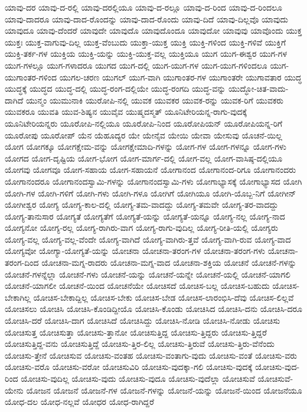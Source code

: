 {ಯಾವು-ದರ
ಯಾವು-ದ-ರಲ್ಲಿ
ಯಾವು-ದರಲ್ಲಿಯೂ
ಯಾವು-ದ-ರಲ್ಲೂ
ಯಾವು-ದ-ರಿಂದ
ಯಾವು-ದ-ರಿಂದಲೂ
ಯಾವು-ದಾದರೂ
ಯಾವು-ದಾದ-ರೊಂದನ್ನು
ಯಾವು-ದಾದ-ರೊಂದು
ಯಾವು-ದಿದೆ
ಯಾವು-ದಿಲ್ಲವೊ
ಯಾವುದು
ಯಾವುದೂ
ಯಾವು-ದೆಂದರೆ
ಯಾವುದೇ
ಯಾವುದೊ
ಯಾವುದೊಂದೂ
ಯಾವುದೋ
ಯಾವುವು
ಯಾವೊಂದು
ಯುಕ್ತ
ಯುಕ್ತಃ
ಯುಕ್ತ-ವಾಗುವು-ದಿಲ್ಲ
ಯುಕ್ತ-ವೆಂಬುದು
ಯುಕ್ತಾ-ಯುಕ್ತ
ಯುಕ್ತಿ
ಯುಕ್ತಿ-ಗಳಿಂದ
ಯುಕ್ತಿ-ಗಳಿವೆ
ಯುಕ್ತಿಗೆ
ಯುಕ್ತಿ-ತರ್ಕ-ಗಳ
ಯುಕ್ತಿಯ
ಯುಕ್ತಿ-ಯನ್ನು
ಯುಕ್ತಿ-ಯುಕ್ತ-ವಲ್ಲ
ಯುಕ್ತಿಯೂ
ಯುಗ
ಯುಗ-ಈಶ್ವರ
ಯುಗ-ಗಳ
ಯುಗ-ಗಳಲ್ಲೂ
ಯುಗ-ಗಳಾದರೂ
ಯುಗದ
ಯುಗ-ದಲ್ಲಿ
ಯುಗ-ಯುಗ-ಗಳ
ಯುಗ-ಯುಗ-ಗಳಿಂದಲೂ
ಯುಗ-ಯುಗಾಂತರ-ಗಳಿಂದ
ಯುಗಲ-ಚರಣ
ಯುಗಲ್
ಯುಗ-ವಾಗಿ
ಯುಗಾಂತರ-ಗಳ
ಯುಗಾಂತರೇ
ಯುಗಾವತಾರ
ಯುದ್ಧ
ಯುದ್ಧಕ್ಕೆ
ಯುದ್ಧದ
ಯುದ್ಧ-ದಲ್ಲಿ
ಯುದ್ಧ-ರಂಗ-ದಲ್ಲಿಯೇ
ಯುದ್ಧ-ರಂಗದಿ
ಯುದ್ಧ-ವನ್ನು
ಯುದ್ಧೋ-ಚಿತ-ವಾದು-ದಾಗಿದೆ
ಯುನ್ಮಂ
ಯುಮುನಾಕಿ
ಯುರೋಪಿ-ನಲ್ಲಿ
ಯುವಕ
ಯುವಕರ
ಯುವಕ-ರನ್ನು
ಯುವಕ-ರಿಗೆ
ಯುವಕರು
ಯುವಕರೂ
ಯುವತಿ
ಯುವ-ಶಿಷ್ಯನ
ಯುವೈವ
ಯುಷ್ಮದಸ್ಮತ್
ಯೂನಿಟೇರಿಯನ್ನ-ರಾಗು-ವುದಕ್ಕೆ
ಯೂನಿಟೇರಿಯನ್ನರು
ಯೂರೋಪಿ-ನಲ್ಲಿಯೂ
ಯೂರೋಪಿ-ನಿಂದ
ಯೂರೋಪಿಯನ್
ಯೂರೋಪಿಯನ್ನ-ರಿಗೆ
ಯೂರೋಪು
ಯೂರೋಪ್
ಯೆನ
ಯೆಹೂದ್ಯರ
ಯೇ
ಯೇನೈವ
ಯೇಯಿ
ಯೇವಾ
ಯೇಸುವು
ಯೊಚನೆ-ಯಿಲ್ಲ
ಯೋಗ
ಯೋಗಕ್ಕೂ
ಯೋಗಕ್ಷೇಮ-ವನ್ನು
ಯೋಗಕ್ಷೇಮಾದಿ-ಗಳನ್ನು
ಯೋಗ-ಗಳ
ಯೋಗ-ಗಳನ್ನೂ
ಯೋಗ-ಗಳು
ಯೋಗದ
ಯೋಗ-ದೃಷ್ಟಿಯ
ಯೋಗ-ಭೋಗ
ಯೋಗ-ಮಾರ್ಗ-ದಲ್ಲಿ
ಯೋಗ-ವಲ್ಲ
ಯೋಗ-ವಾಸಿಷ್ಠ-ದಲ್ಲಿಯೂ
ಯೋಗವು
ಯೋಗವೂ
ಯೋಗ-ಸಹಾಯ
ಯೋಗ-ಸಹಾಯನೆ
ಯೋಗಾನಂದ
ಯೋಗಾನಂದ-ರಿಗೂ
ಯೋಗಾನಂದರು
ಯೋಗಾನಂದರೂ
ಯೋಗಾನಂದಸ್ವಾಮಿ-ಗಳನ್ನು
ಯೋಗಾನಂದಸ್ವಾಮಿ-ಗಳು
ಯೋಗಾಭ್ಯಾಸಕ್ಕೆ
ಯೋಗಾಭ್ಯಾಸದ
ಯೋಗಿ
ಯೋಗಿ-ಗಳ
ಯೋಗಿ-ಗಳಿಗೆ
ಯೋಗಿ-ಗಳು
ಯೋಗಿ-ಗಳೂ
ಯೋಗಿಗೆ
ಯೋಗಿಯೂ
ಯೋಗಿ-ಯೊಬ್ಬ-ನಿಗೆ
ಯೋಗೀನ್
ಯೋಗೀಶ್ವರ
ಯೋಗ್ಯ
ಯೋಗ್ಯ-ಕಾಲ-ದಲ್ಲಿ
ಯೋಗ್ಯ-ತಮ-ವಾದದ್ದು
ಯೋಗ್ಯ-ತಮವೇ
ಯೋಗ್ಯ-ತರ-ವಾದದ್ದು
ಯೋಗ್ಯ-ತಾನುಸಾರ
ಯೋಗ್ಯತೆ
ಯೋಗ್ಯತೆಗೆ
ಯೋಗ್ಯತೆ-ಯನ್ನು
ಯೋಗ್ಯತೆ-ಯನ್ನೂ
ಯೋಗ್ಯ-ನಲ್ಲ
ಯೋಗ್ಯ-ನಾದ
ಯೋಗ್ಯನೋ
ಯೋಗ್ಯ-ರಲ್ಲ
ಯೋಗ್ಯ-ರಾಗಿರು-ವಾಗ
ಯೋಗ್ಯ-ರಾಗು-ವುದಿಲ್ಲ
ಯೋಗ್ಯ-ರೀತಿ-ಯಲ್ಲಿ
ಯೋಗ್ಯರು
ಯೋಗ್ಯ-ವಲ್ಲ
ಯೋಗ್ಯ-ವಲ್ಲ-ವೆಂದೇ
ಯೋಗ್ಯ-ವಾಗಿದೆ
ಯೋಗ್ಯ-ವಾಗಿರು-ತ್ತವೆ
ಯೋಗ್ಯ-ವಾಗಿ-ರುವ
ಯೋಗ್ಯ-ವಾದ
ಯೋಗ್ಯವೋ
ಯೋಗ್ಯಾ-ಯೋಗ್ಯತೆ-ಯನ್ನು
ಯೋಚನಾ
ಯೋಚನಾ-ತರಂಗ-ಗಳ
ಯೋಚನಾ-ತರಂಗ-ಗಳು
ಯೋಚನಾ-ತರಂಗ-ದಿಂದ
ಯೋಚನಾ-ಮಗ್ನ-ರಾದರು
ಯೋಚನಾ-ಮಗ್ನ-ವಾದ
ಯೋಚನಾ-ಶಕ್ತಿಯ
ಯೋಚನೆ
ಯೋಚನೆ-ಗಳನ್ನು
ಯೋಚನೆ-ಗಳನ್ನೆಲ್ಲಾ
ಯೋಚನೆ-ಗಳು
ಯೋಚನೆ-ಯನ್ನು
ಯೋಚನೆ-ಯನ್ನೇ
ಯೋಚನೆ-ಯಲ್ಲಿ
ಯೋಚನೆ-ಯಾಗಲಿ
ಯೋಚನೆ-ಯಾಗಲೀ
ಯೋಚನೆ-ಯಿಂದ
ಯೋಚನೆಯೇ
ಯೋಚಿಸದೆ
ಯೋಚಿಸ-ಬಲ್ಲ
ಯೋಚಿಸ-ಬಹುದು
ಯೋಚಿಸ-ಬೇಕಾಗಿಲ್ಲ
ಯೋಚಿಸ-ಬೇಕಾದ್ದಿಲ್ಲ
ಯೋಚಿಸ-ಬೇಕು
ಯೋಚಿಸ-ಬೇಡ
ಯೋಚಿಸ-ಲಾರಂಭಿಸಿ-ದೆವು
ಯೋಚಿಸ-ಲಿಲ್ಲವೆ
ಯೋಚಿಸಲು
ಯೋಚಿಸಿ
ಯೋಚಿಸಿ-ಕೊಂಡಿದ್ದೀಯೊ
ಯೋಚಿಸಿ-ಕೊಂಡು
ಯೋಚಿಸಿದ
ಯೋಚಿಸಿ-ದನು
ಯೋಚಿಸಿ-ದರೂ
ಯೋಚಿಸಿ-ದರೆ
ಯೋಚಿಸಿ-ದಾಗ
ಯೋಚಿಸಿದೆ
ಯೋಚಿಸಿದ್ದು
ಯೋಚಿಸಿ-ನೋಡಿ
ಯೋಚಿಸಿ-ನೋಡು
ಯೋಚಿಸು
ಯೋಚಿಸುತ್ತ
ಯೋಚಿಸುತ್ತಾ
ಯೋಚಿಸು-ತ್ತಾನೋ
ಯೋಚಿಸುತ್ತಿದ್ದ
ಯೋಚಿಸು-ತ್ತಿದ್ದರು
ಯೋಚಿಸು-ತ್ತಿದ್ದರೆ
ಯೋಚಿಸುತ್ತಿದ್ದ-ವನು
ಯೋಚಿಸುತ್ತಿದ್ದೆ
ಯೋಚಿಸು-ತ್ತಿರ-ಲಿಲ್ಲ
ಯೋಚಿಸು-ತ್ತಿರುವೆ
ಯೋಚಿಸು-ತ್ತಿರು-ವೆನೆಂದು
ಯೋಚಿಸು-ತ್ತೇನೆ
ಯೋಚಿಸುವ
ಯೋಚಿಸು-ವಂತಹ
ಯೋಚಿಸು-ವಂತಾಗು-ವುದು
ಯೋಚಿಸು-ವಂತೆ
ಯೋಚಿಸು-ವರು
ಯೋಚಿಸು-ವರೊ
ಯೋಚಿಸು-ವರೋ
ಯೋಚಿಸುವಿರಿ
ಯೋಚಿಸು-ವುದಕ್ಕಾ-ಗಲಿ
ಯೋಚಿಸು-ವುದಕ್ಕೆ
ಯೋಚಿಸು-ವುದ-ರಿಂದ
ಯೋಚಿಸು-ವುದಿಲ್ಲ
ಯೋಚಿಸು-ವುದು
ಯೋಚಿಸು-ವುದೂ
ಯೋಚಿಸು-ವುದೆಲ್ಲಾ
ಯೋಚಿಸುವೆ
ಯೋಚಿಸುವೆ-ಯೇನು
ಯೋಜನ
ಯೋಜನೆ
ಯೋಜನೆ-ಗಳ
ಯೋಜನೆ-ಗಳನ್ನು
ಯೋಜನೆ-ಯನ್ನು
ಯೋಜನೆ-ಯಿಂದ
ಯೋಜನೆಯೂ
ಯೋಧ-ದಲ
ಯೋಧ-ನಲ್ಲವೆ
ಯೋಧರ
ಯೋಧ-ರಾಗಿದ್ದರೆ
}

